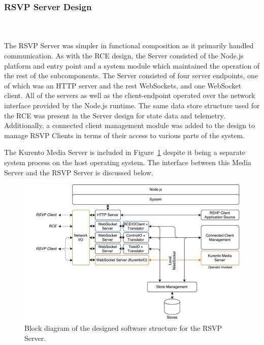     \subsubsection{RSVP Server Design}
    \label{subsubsec:rsvpServersPlan}
      \\\\
        The RSVP Server was simpler in functional composition as it primarily handled communication. As with the RCE design, the Server consisted of the Node.js platform and entry point and a system module which maintained the operation of the rest of the subcomponents. The Server consisted of four server endpoints, one of which was an HTTP server and the rest WebSockets, and one WebSocket client. All of the servers as well as the client-endpoint operated over the network interface provided by the Node.js runtime. The same data store structure used for the RCE was present in the Server design for state data and telemetry. Additionally, a connected client management module was added to the design to manage RSVP Clients in terms of their access to various parts of the system.
        
        The Kurento Media Server is included in Figure~\ref{fig:softDesign-serverStructurePlan} despite it being a separate system process on the host operating system. The interface between this Media Server and the RSVP Server is discussed below.
      
        \begin{figure}[h!]
          \centering
          \includegraphics[width=1\linewidth]{figures/softDesign-serverStructurePlan}
          \caption[Block diagram of the designed software structure for the RSVP Server.]{Block diagram of the designed software structure for the RSVP Server.}
          \label{fig:softDesign-serverStructurePlan}
        \end{figure}

